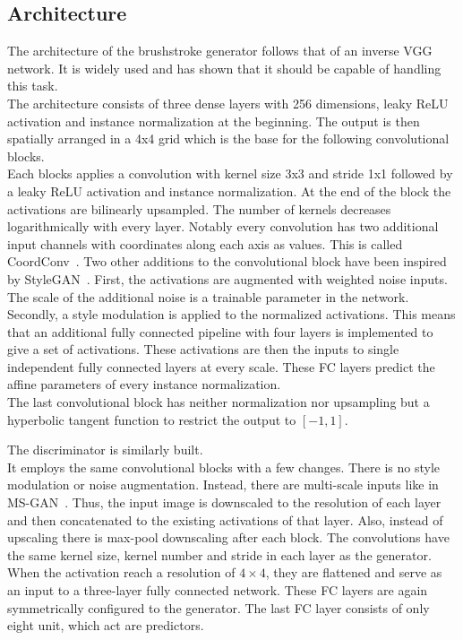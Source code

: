 \subsection{Architecture}
The architecture of the brushstroke generator follows that of an inverse VGG network.
It is widely used and has shown that it should be capable of handling this task.\\
The architecture consists of three dense layers with 256 dimensions, leaky ReLU activation and instance normalization at the beginning.
The output is then spatially arranged in a 4x4 grid which is the base for the following convolutional blocks.\\
Each blocks applies a convolution with kernel size 3x3 and stride 1x1 followed by a leaky ReLU activation and instance normalization.
At the end of the block the activations are bilinearly upsampled.
The number of kernels decreases logarithmically with every layer.
Notably every convolution has two additional input channels with coordinates along each axis as values.
This is called CoordConv~\cite{coordconv}.
Two other additions to the convolutional block have been inspired by StyleGAN~\cite{StyleGAN}.
First, the activations are augmented with weighted noise inputs.
The scale of the additional noise is a trainable parameter in the network.
Secondly, a style modulation is applied to the normalized activations.
This means that an additional fully connected pipeline with four layers is implemented to give a set of activations.
These activations are then the inputs to single independent fully connected layers at every scale.
These FC layers predict the affine parameters of every instance normalization.\\
The last convolutional block has neither normalization nor upsampling but a hyperbolic tangent function to restrict the output to $[-1, 1]$.

The discriminator is similarly built.\\
It employs the same convolutional blocks with a few changes.
There is no style modulation or noise augmentation.
Instead, there are multi-scale inputs like in MS-GAN~\cite{MSG-GAN}.
Thus, the input image is downscaled to the resolution of each layer and then concatenated to the existing activations of that layer.
Also, instead of upscaling there is max-pool downscaling after each block.
The convolutions have the same kernel size, kernel number and stride in each layer as the generator.\\
When the activation reach a resolution of $4\times4$, they are flattened and serve as an input to a three-layer fully connected network.
These FC layers are again symmetrically configured to the generator.
The last FC layer consists of only eight unit, which act are predictors.

